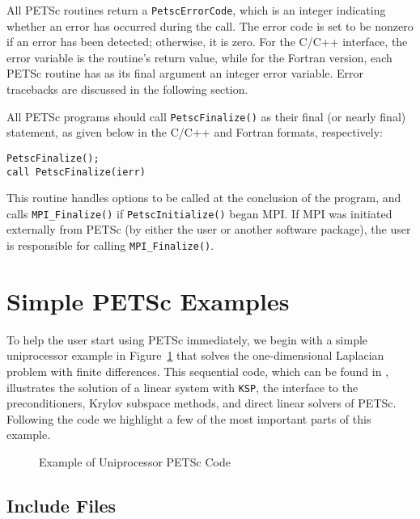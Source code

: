 All PETSc routines return a \lstinline{PetscErrorCode}, which is an integer indicating whether an error has
occurred during the call.  The error code is set to be nonzero if an
error has been detected; otherwise, it is zero.  For the C/C++
interface, the error variable is the routine's return value, while for
the Fortran version, each PETSc routine has as its final argument an
integer error variable.  Error tracebacks are discussed in the following
section.

All PETSc programs should call \lstinline{PetscFinalize()}
as their final (or nearly final) statement, as given below in the C/C++
and Fortran formats, respectively:
\begin{lstlisting}
PetscFinalize();
call PetscFinalize(ierr)
\end{lstlisting}
This routine handles options to be called at the conclusion of
the program, and calls \lstinline{MPI_Finalize()} 
if \lstinline{PetscInitialize()}
began MPI. If MPI was initiated externally from PETSc (by either
the user or another software package), the user is
responsible for calling \lstinline{MPI_Finalize()}.

\section{Simple PETSc Examples}

\label{sec_simple}

To help the user start using PETSc immediately, we begin with a simple
uniprocessor example in Figure~\ref{fig_example1} that solves the
one-dimensional Laplacian problem with finite differences.  This
sequential code, which can be found in
,
illustrates the solution of a linear system with \lstinline{KSP}, the
interface to the preconditioners, Krylov subspace methods, and direct
linear solvers of PETSc.  Following the code we highlight a few of the most important
parts of this example.

\begin{figure}[H]
{
  
}
\caption{Example of Uniprocessor PETSc Code}
\label{fig_example1}
\end{figure}

\subsection*{Include Files}

